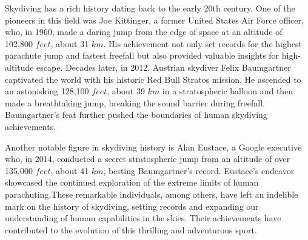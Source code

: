 \documentclass[a4paper, 14pt]{extarticle}
\begin{document}
Skydiving has a rich history dating back to the early 20th century.
One of the pioneers in this field was Joe Kittinger, a former United States Air Force officer, who, in 1960, made a
daring jump from the edge of space at an altitude of 102,800 $feet$, about 31 $km$. His achievement not only set records
for the highest parachute jump and fastest freefall but also provided valuable insights for high-altitude escape.
Decades later, in 2012, Austrian skydiver Felix Baumgartner captivated the world with his historic Red Bull Stratos
mission. He ascended to an astonishing 128,100 $feet$, 
about 39 $km$ in a stratospheric balloon and then made a breathtaking jump, breaking the sound barrier during freefall. Baumgartner's feat further pushed the boundaries of human skydiving achievements.

Another notable figure in skydiving history is Alan Eustace, a Google executive who, in 2014, conducted a secret
stratospheric jump from an altitude of over 135,000 $feet$, about 41 $km$, besting Baumgartner's record. Eustace's endeavor showcased the continued exploration of the extreme limits of human parachuting.These remarkable individuals,
among others, have left an indelible mark on the history of skydiving, setting records and expanding our understanding
of human capabilities in the skies. Their achievements have contributed to the evolution of this thrilling and 
adventurous sport.
\end{document}
